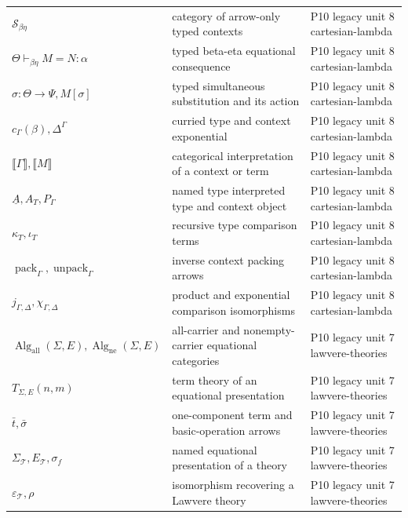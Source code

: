 \begin{longtable}{@{}p{}p{}p{}@{}}
\(\mathcal S_{\beta\eta}\) & category of arrow-only typed contexts & P10 legacy unit 8 cartesian-\allowbreak{}lambda \\
\(\Theta\vdash_{\beta\eta}M=N:\alpha\) & typed beta-eta equational consequence & P10 legacy unit 8 cartesian-\allowbreak{}lambda \\
\(\sigma:\Theta\to\Psi,\allowbreak M[\sigma]\) & typed simultaneous substitution and its action & P10 legacy unit 8 cartesian-\allowbreak{}lambda \\
\(c_\Gamma(\beta),\allowbreak \Delta^\Gamma\) & curried type and context exponential & P10 legacy unit 8 cartesian-\allowbreak{}lambda \\
\(\llbracket\Gamma\rrbracket,\allowbreak \llbracket M\rrbracket\) & categorical interpretation of a context or term & P10 legacy unit 8 cartesian-\allowbreak{}lambda \\
\(\underline A,\allowbreak A_T,\allowbreak P_\Gamma\) & named type interpreted type and context object & P10 legacy unit 8 cartesian-\allowbreak{}lambda \\
\(\kappa_T,\allowbreak \iota_T\) & recursive type comparison terms & P10 legacy unit 8 cartesian-\allowbreak{}lambda \\
\(\operatorname{pack}_\Gamma,\allowbreak \operatorname{unpack}_\Gamma\) & inverse context packing arrows & P10 legacy unit 8 cartesian-\allowbreak{}lambda \\
\(j_{\Gamma,\Delta},\allowbreak \chi_{\Gamma,\Delta}\) & product and exponential comparison isomorphisms & P10 legacy unit 8 cartesian-\allowbreak{}lambda \\
\(\operatorname{Alg}_{\mathrm{all}}(\Sigma,\allowbreak E),\allowbreak \operatorname{Alg}_{\mathrm{ne}}(\Sigma,\allowbreak E)\) & all-carrier and nonempty-carrier equational categories & P10 legacy unit 7 lawvere-\allowbreak{}theories \\
\(T_{\Sigma,E}(n,\allowbreak m)\) & term theory of an equational presentation & P10 legacy unit 7 lawvere-\allowbreak{}theories \\
\(\bar t,\allowbreak \bar\sigma\) & one-component term and basic-operation arrows & P10 legacy unit 7 lawvere-\allowbreak{}theories \\
\(\Sigma_{\mathcal T},\allowbreak E_{\mathcal T},\allowbreak \sigma_f\) & named equational presentation of a theory & P10 legacy unit 7 lawvere-\allowbreak{}theories \\
\(\varepsilon_{\mathcal T},\allowbreak \rho\) & isomorphism recovering a Lawvere theory & P10 legacy unit 7 lawvere-\allowbreak{}theories \\

\end{longtable}

